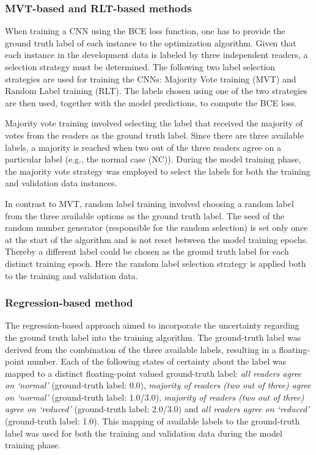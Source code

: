 \subsubsection{MVT-based and RLT-based methods}
\label{subsubsec:cnn_based_classification_mvt_rlt}

When training a CNN using the BCE loss function, 
one has to provide the ground truth label of each instance to the optimization algorithm.
Given that each instance in the development data is labeled by three independent readers, 
a selection strategy must be determined.
The following two label selection strategies are used for training the CNNs: 
Majority Vote training (MVT) and Random Label training (RLT).
The labels chosen using one of the two strategies are then used, together with the model predictions, 
to compute the BCE loss.

Majority vote training involved selecting the label that received the majority of votes from the readers as the 
ground truth label.
Since there are three available labels, 
a majority is reached when two out of the three readers agree on a particular label (e.g., the normal case (NC)).
During the model training phase, the majority vote strategy was employed to select the labels for both the training 
and validation data instances.

In contrast to MVT, random label training involved choosing a random label from the three available options
as the ground truth label.
The seed of the random number generator (responsible for the random selection) is set only once at the start of the
algorithm and is not reset between the model training epochs.
Thereby a different label could be chosen as the ground truth label for each distinct training epoch.
Here the random label selection strategy is applied both to the training and validation data.

\subsubsection{Regression-based method}
\label{subsubsec:cnn_based_classification_regression}

The regression-based approach aimed to incorporate the uncertainty regarding the ground truth label 
into the training algorithm.
The ground-truth label was derived from the combination of the three available labels, 
resulting in a floating-point number.
Each of the following states of certainty about the label was mapped to a distinct 
floating-point valued ground-truth label: 
\emph{all readers agree on `normal' } (ground-truth label: 0.0), 
\emph{majority of readers (two out of three) agree on `normal'} (ground-truth label: 1.0/3.0), 
\emph{majority of readers (two out of three) agree on `reduced'} (ground-truth label: 2.0/3.0) 
and \emph{all readers agree on `reduced'} (ground-truth label: 1.0).
This mapping of available labels to the ground-truth label was used for both the training 
and validation data during the model training phase.


